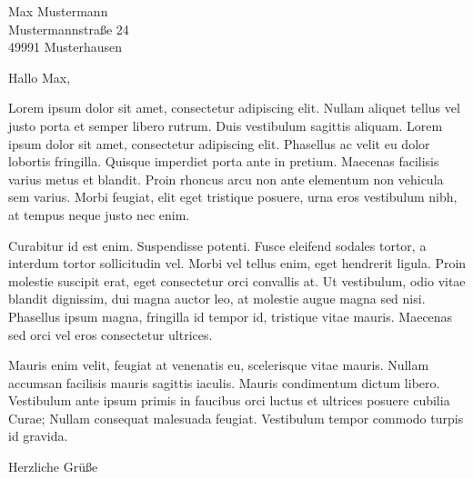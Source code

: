 \documentclass[
	pagenumber=false, %
	parskip=half, %
	foldmarks=true, %
	addrfield=true,
	fromphone=true,
	fromemail=true,
	fromurl=true,
	locfield=wide,
  enlargefirstpage=true
	]{scrlttr2}
\begin{document}
 
\begin{letter}{Max Mustermann\\ Mustermannstraße 24 \\ 49991 Musterhausen} %


\opening{Hallo Max,}

Lorem ipsum dolor sit amet, consectetur adipiscing elit. Nullam aliquet tellus vel justo porta et semper libero rutrum. Duis vestibulum sagittis aliquam. Lorem ipsum dolor sit amet, consectetur adipiscing elit. Phasellus ac velit eu dolor lobortis fringilla. Quisque imperdiet porta ante in pretium. Maecenas facilisis varius metus et blandit. Proin rhoncus arcu non ante elementum non vehicula sem varius. Morbi feugiat, elit eget tristique posuere, urna eros vestibulum nibh, at tempus neque justo nec enim.

Curabitur id est enim. Suspendisse potenti. Fusce eleifend sodales tortor, a interdum tortor sollicitudin vel. Morbi vel tellus enim, eget hendrerit ligula. Proin molestie suscipit erat, eget consectetur orci convallis at. Ut vestibulum, odio vitae blandit dignissim, dui magna auctor leo, at molestie augue magna sed nisi. Phasellus ipsum magna, fringilla id tempor id, tristique vitae mauris. Maecenas sed orci vel eros consectetur ultrices.

Mauris enim velit, feugiat at venenatis eu, scelerisque vitae mauris. Nullam accumsan facilisis mauris sagittis iaculis. Mauris condimentum dictum libero. Vestibulum ante ipsum primis in faucibus orci luctus et ultrices posuere cubilia Curae; Nullam consequat malesuada feugiat. Vestibulum tempor commodo turpis id gravida.

\closing{Herzliche Grüße}


\end{letter}
 
\end{document}
